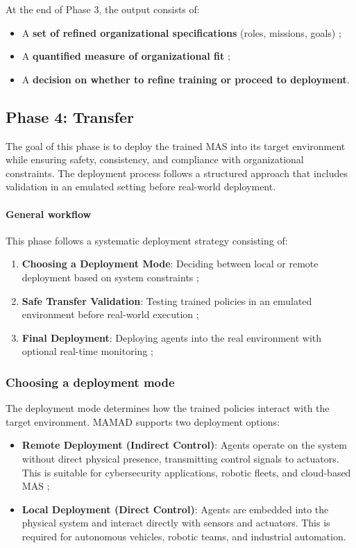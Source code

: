 \documentclass[journal]{IEEEtai}
\begin{document}
At the end of Phase 3, the output consists of:
\begin{itemize}
    \item A \textbf{set of refined organizational specifications} (roles, missions, goals) ;
    \item A \textbf{quantified measure of organizational fit} ;
    \item A \textbf{decision on whether to refine training or proceed to deployment}.
\end{itemize}



\subsection{Phase 4: Transfer}

The goal of this phase is to deploy the trained MAS into its target environment while ensuring safety, consistency, and compliance with organizational constraints. The deployment process follows a structured approach that includes validation in an emulated setting before real-world deployment.

\paragraph{\textbf{General workflow}}
This phase follows a systematic deployment strategy consisting of:
\begin{enumerate}
    \item \textbf{Choosing a Deployment Mode}: Deciding between local or remote deployment based on system constraints ;
    \item \textbf{Safe Transfer Validation}: Testing trained policies in an emulated environment before real-world execution ;
    \item \textbf{Final Deployment}: Deploying agents into the real environment with optional real-time monitoring ;
\end{enumerate}

\subsubsection{Choosing a deployment mode}
The deployment mode determines how the trained policies interact with the target environment. MAMAD supports two deployment options:

\begin{itemize}
    \item \textbf{Remote Deployment (Indirect Control)}: Agents operate on the system without direct physical presence, transmitting control signals to actuators. This is suitable for cybersecurity applications, robotic fleets, and cloud-based MAS ;
    \item \textbf{Local Deployment (Direct Control)}: Agents are embedded into the physical system and interact directly with sensors and actuators. This is required for autonomous vehicles, robotic teams, and industrial automation.
\end{itemize}
\end{document}
